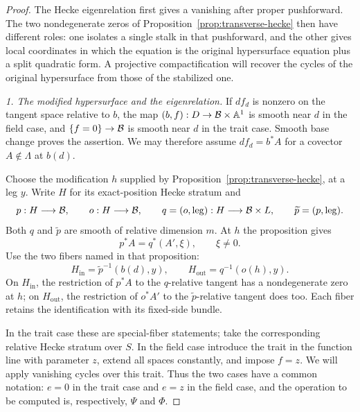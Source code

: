 \begin{proof}
The Hecke eigenrelation first gives a vanishing after proper pushforward.
The two nondegenerate zeros of Proposition~\ref{prop:transverse-hecke}
then have different roles: one isolates a single stalk in that pushforward,
and the other gives local coordinates in which the equation is the original
hypersurface equation plus a split quadratic form.  A projective compactification
will recover the cycles of the original hypersurface from those of the
stabilized one.

\smallskip\noindent
\emph{1. The modified hypersurface and the eigenrelation.}
If $df_d$ is nonzero on the tangent space relative to $b$, the map
$(b,f):D\to\mathcal B\times\mathbb A^1$ is smooth near $d$ in the field case,
and $\{f=0\}\to\mathcal B$ is smooth near $d$ in the trait case.  Smooth base
change proves the assertion.  We may therefore assume
$df_d=b^*A$ for a covector $A\notin\Lambda$ at $b(d)$.

Choose the modification $h$ supplied by
Proposition~\ref{prop:transverse-hecke}, at a leg $y$.  Write $H$ for its
exact-position Hecke stratum and
\[
 p:H\longrightarrow\mathcal B,\qquad
 o:H\longrightarrow\mathcal B,\qquad
 q=(o,\operatorname{leg}):H\longrightarrow\mathcal B\times L,
 \qquad \widetilde p=(p,\operatorname{leg}).
\]
Both $q$ and $\widetilde p$ are smooth of relative dimension $m$.  At $h$
the proposition gives
\begin{equation}\label{eq:detection-leg}
                 p^*A=q^*(A',\xi),\qquad \xi\ne0.
\end{equation}
Use the two fibers named in that proposition:
\[
 H_{\mathrm{in}}=\widetilde p^{-1}(b(d),y),\qquad
 H_{\mathrm{out}}=q^{-1}(o(h),y).
\]
On $H_{\mathrm{in}}$, the restriction of $p^*A$ to the $q$-relative
tangent has a nondegenerate zero at $h$; on $H_{\mathrm{out}}$, the
restriction of $o^*A'$ to the $\widetilde p$-relative tangent does too.
Each fiber retains the identification with its fixed-side bundle.

In the trait case these are special-fiber statements; take the
corresponding relative Hecke stratum over $S$.  In the field case introduce
the trait in the function line with parameter $z$, extend all spaces
constantly, and impose $f=z$.  We will apply vanishing cycles over this
trait.  Thus the two cases have a common notation: $e=0$ in the trait
case and $e=z$ in the field case, and the operation to be computed is,
respectively, $\Psi$ and $\Phi$.


\end{proof}
